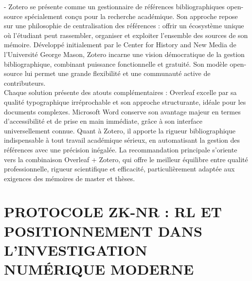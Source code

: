 \documentclass[]{article}
\begin{document}
- Zotero se présente comme un gestionnaire de références bibliographiques open-source
spécialement conçu pour la recherche académique. Son approche repose sur une philosophie de centralisation des références : offrir un écosystème unique où l'étudiant peut rassembler, organiser et exploiter l'ensemble des sources de son mémoire. Développé initialement par le Center for History and New Media de l'Université George Mason, Zotero incarne une vision démocratique de la gestion bibliographique, combinant puissance fonctionnelle et gratuité. Son modèle open-source lui permet une grande flexibilité et une communauté active de contributeurs.\\
Chaque solution présente des atouts complémentaires : Overleaf excelle par sa qualité typographique irréprochable et son approche structurante, idéale pour les documents complexes. Microsoft Word conserve son avantage majeur en termes d'accessibilité et de prise en main immédiate, grâce à son interface universellement connue. Quant à Zotero, il apporte la rigueur bibliographique indispensable à tout travail académique sérieux, en automatisant la gestion des références avec une précision inégalée. La recommandation principale s'oriente vers la combinaison Overleaf + Zotero, qui offre le meilleur équilibre entre qualité professionnelle, rigueur scientifique et efficacité, particulièrement adaptée aux exigences des mémoires de master et thèses.

\section{PROTOCOLE ZK-NR : RL ET POSITIONNEMENT DANS L’INVESTIGATION NUMÉRIQUE MODERNE}
\end{document}
